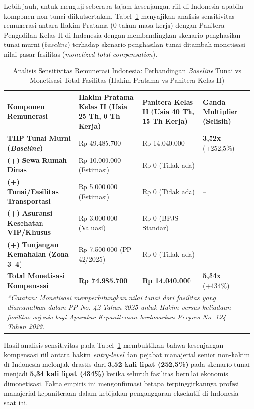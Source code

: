 \documentclass[12pt, a4paper]{article}
\begin{document}
Lebih jauh, untuk menguji seberapa tajam kesenjangan riil di Indonesia apabila komponen non-tunai diikutsertakan, Tabel~\ref{tab:sensitivitas-monetisasi} menyajikan analisis sensitivitas remunerasi antara Hakim Pratama (0 tahun masa kerja) dengan Panitera Pengadilan Kelas II di Indonesia dengan membandingkan skenario penghasilan tunai murni (\textit{baseline}) terhadap skenario penghasilan tunai ditambah monetisasi nilai pasar fasilitas (\textit{monetized total compensation}).

\begin{table}[H]
\centering
\fontsize{9}{11}\selectfont
\caption{Analisis Sensitivitas Remunerasi Indonesia: Perbandingan \textit{Baseline} Tunai vs Monetisasi Total Fasilitas (Hakim Pratama vs Panitera Kelas II)}
\label{tab:sensitivitas-monetisasi}
\renewcommand{\arraystretch}{1.3}
\begin{tabular}{p{4.5cm} p{3.8cm} p{3.8cm} p{2.2cm}}
\hline
\textbf{Komponen Remunerasi} & \textbf{Hakim Pratama Kelas II (Usia 25 Th, 0 Th Kerja)} & \textbf{Panitera Kelas II (Usia 40 Th, 15 Th Kerja)} & \textbf{Ganda Multiplier (Selisih)} \\
\hline
\raggedright\textbf{THP Tunai Murni (\textit{Baseline})} & Rp 49.485.700 & Rp 14.040.000 & \textbf{3,52x} (+252,5\%) \\
\raggedright\textbf{(+) Sewa Rumah Dinas} & Rp 10.000.000 (Estimasi) & Rp 0 (Tidak ada) & -- \\
\raggedright\textbf{(+) Tunai/Fasilitas Transportasi} & Rp 5.000.000 (Estimasi) & Rp 0 (Tidak ada) & -- \\
\raggedright\textbf{(+) Asuransi Kesehatan VIP/Khusus} & Rp 3.000.000 (Valuasi) & Rp 0 (BPJS Standar) & -- \\
\raggedright\textbf{(+) Tunjangan Kemahalan (Zona 3--4)} & Rp 7.500.000 (PP 42/2025) & Rp 0 (Tidak ada) & -- \\
\hline
\raggedright\textbf{Total Monetisasi Kompensasi} & \textbf{Rp 74.985.700} & \textbf{Rp 14.040.000} & \textbf{5,34x} (+434\%) \\
\hline
\multicolumn{4}{p{14.5cm}}{\textit{*Catatan: Monetisasi memperhitungkan nilai tunai dari fasilitas yang diamanatkan dalam PP No. 42 Tahun 2025 untuk Hakim versus ketiadaan fasilitas sejenis bagi Aparatur Kepaniteraan berdasarkan Perpres No. 124 Tahun 2022.}} \\
\hline
\end{tabular}
\end{table}

Hasil analisis sensitivitas pada Tabel~\ref{tab:sensitivitas-monetisasi} membuktikan bahwa kesenjangan kompensasi riil antara hakim \textit{entry-level} dan pejabat manajerial senior non-hakim di Indonesia melonjak drastis dari \textbf{3,52 kali lipat (252,5\%)} pada skenario tunai menjadi \textbf{5,34 kali lipat (434\%)} ketika seluruh fasilitas bernilai ekonomis dimonetisasi. Fakta empiris ini mengonfirmasi betapa terpinggirkannya profesi manajerial kepaniteraan dalam kebijakan penganggaran eksekutif di Indonesia saat ini.
\end{document}
